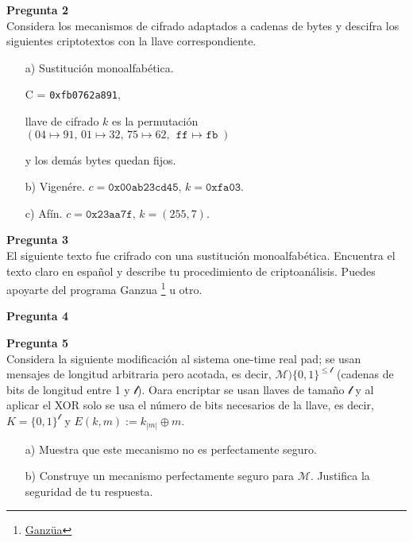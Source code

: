 \documentclass{article}
\newenvironment{problem}[2][Pregunta]
    { \begin{mdframed}[backgroundcolor=gray!20] \textbf{#1 #2} \\}
    {  \end{mdframed}}
\begin{document}
\begin{problem}{2}
  Considera los mecanismos de cifrado adaptados a cadenas de bytes y descifra los siguientes
  criptotextos con la llave correspondiente.

  \begin{enumerate}
  \item[a)] Sustitución monoalfabética.
    
    C = {\tt 0xfb0762a891},

    llave de cifrado $k$ es la permutación $(04 \mapsto 91,\, 01 \mapsto 32,\, 75 \mapsto 62,\,
    \texttt{ff $\mapsto$ fb})$
    
    y los demás bytes quedan fijos. 
  \item[b)] Vigenére. $c = \texttt{0x00ab23cd45},\, k = \texttt{0xfa03}$.
  \item[c)] Afín. $c = \texttt{0x23aa7f},\, k = (255, 7)$.
  \end{enumerate}
\end{problem}

\begin{problem}{3}
  El siguiente texto fue crifrado con una sustitución monoalfabética. Encuentra el texto claro en
  español y describe tu procedimiento de criptoanálisis. Puedes apoyarte del programa Ganzua
  \footnote{\href{https://ganzua.sourceforge.net/en/index.html}{Ganzüa}} u otro.


\end{problem}

\begin{problem}{4}
  
\end{problem}

\begin{problem}{5}
  Considera la siguiente modificación al sistema one-time real pad; se usan mensajes de longitud
  arbitraria pero acotada, es decir, $\mathcal{M} ) \{0,1\}^{\leq\mathcal{l}}$ (cadenas de bits de
  longitud entre 1 y $\mathcal{l}$). Oara encriptar se usan llaves de tamaño $\mathcal{l}$ y
  al aplicar el {\rm XOR} solo se usa el número de bits necesarios de la llave, es decir,
  $K = \{0,1\}^\mathcal{l}$ y $E(k,m):=k_{|m|} \oplus m$.

  \begin{enumerate}
  \item[a)] Muestra que este mecanismo no es perfectamente seguro.
    
  \item[b)] Construye un mecanismo perfectamente seguro para $\mathcal{M}$.
    Justifica la seguridad de tu respuesta.
  \end{enumerate}
\end{problem}
\end{document}
